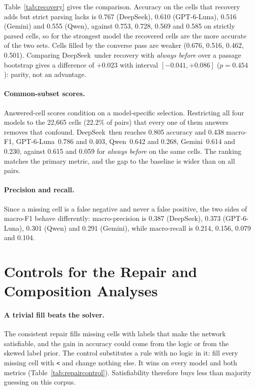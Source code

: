 \documentclass[11pt]{article}
\newcommand{\rel}[1]{\texttt{#1}}
\newcommand{\Ds}{DeepSeek}
\newcommand{\Gp}{GPT-6-Luna}
\newcommand{\Gm}{Gemini}
\newcommand{\Qw}{Qwen}
\begin{document}
Table~\ref{tab:recovery} gives the comparison. Accuracy on the cells that recovery adds but
strict parsing lacks is 0.767 (\Ds), 0.610 (\Gp), 0.516 (\Gm) and 0.555 (\Qw), against 0.753,
0.728, 0.569 and 0.585 on strictly parsed cells, so for the strongest model the recovered cells
are the more accurate of the two sets. Cells filled by the converse pass are weaker (0.676,
0.516, 0.462, 0.501). Comparing \Ds\ under recovery with \emph{always before} over a passage
bootstrap gives a difference of $+0.023$ with interval $[-0.041, +0.086]$ ($p=0.454$): parity,
not an advantage.

\paragraph{Common-subset scores.}
Answered-cell scores condition on a model-specific selection. Restricting all four models to the
22,665 cells (22.2\% of pairs) that every one of them answers removes that confound.
\Ds\ then reaches 0.805 accuracy and 0.438 macro-F1, \Gp\ 0.786 and 0.403, \Qw\ 0.642 and 0.268,
\Gm\ 0.614 and 0.230, against 0.615 and 0.059 for \emph{always before} on the same cells. The
ranking matches the primary metric, and the gap to the baseline is wider than on all pairs.

\paragraph{Precision and recall.}
Since a missing cell is a false negative and never a false positive, the two sides of macro-F1
behave differently: macro-precision is 0.387 (\Ds), 0.373 (\Gp), 0.301 (\Qw) and 0.291 (\Gm),
while macro-recall is 0.214, 0.156, 0.079 and 0.104.

\section{Controls for the Repair and Composition Analyses}
\label{app:controls}

\paragraph{A trivial fill beats the solver.}
The consistent repair fills missing cells with labels that make the network satisfiable, and the
gain in accuracy could come from the logic or from the skewed label prior. The control
substitutes a rule with no logic in it: fill every missing cell with \rel{<} and change nothing
else. It wins on every model and both metrics (Table~\ref{tab:repaircontrol}). Satisfiability
therefore buys less than majority guessing on this corpus.
\end{document}
